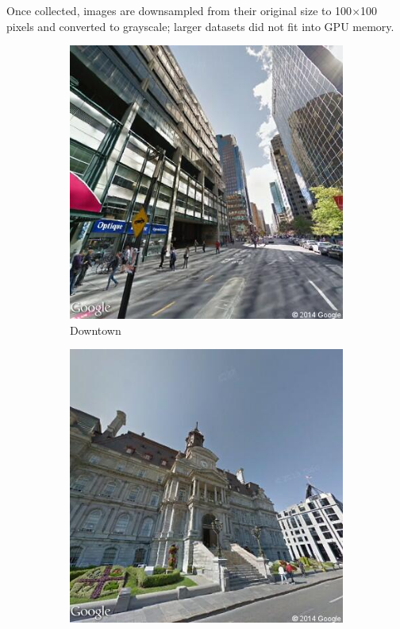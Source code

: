 \documentclass{acm_proc_article-sp}
\begin{document}
Once collected, images are downsampled from their original size to 100$\times$100 pixels and converted to grayscale; larger datasets did not fit into GPU memory.

\begin{figure}[h!]
\centering
	\begin{subfigure}[b]{0.3\linewidth}
		\includegraphics[width=\linewidth]{downtown.png}
		\caption{Downtown}
		\label{fig:downtown}
	\end{subfigure}
	\begin{subfigure}[b]{0.3\linewidth}
		\includegraphics[width=\linewidth]{oldmontreal.png}

\end{subfigure}
\end{figure}
\end{document}
